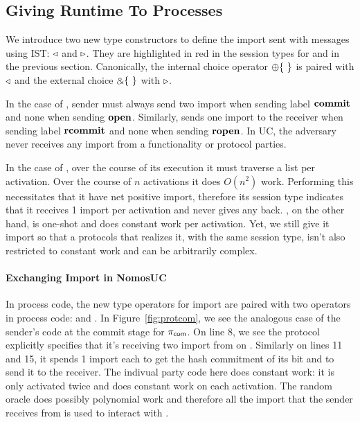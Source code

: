 \subsection{Giving Runtime To Processes}
We introduce two new type constructors to define the import sent with messages using IST: $\triangleleft$ and $\triangleright$.
They are highlighted in red in the session types for \Fcom and \Fro in the previous section.
Canonically, the internal choice operator $\ichoice$ is paired with $\triangleleft$ and the external choice $\echoice$ with $\triangleright$.

In the case of \Fcom, sender must always send two import when sending label $\mathbf{commit}$ and none when sending $\mathbf{open}$.
Similarly, \Fcom sends one import to the receiver when sending label $\mathbf{rcommit}$ and none when sending $\mathbf{ropen}$.
In UC, the adversary never receives any import from a functionality or protocol parties.

In the case of \Fro, over the course of its execution it must traverse a list per activation.
Over the course of $n$ activations it does $O(n^2)$ work.
Performing this necessitates that it have net positive import, therefore its session type indicates that it receives 1 import per activation and never gives any back.
\Fcom, on the other hand, is one-shot and does constant work per activation. Yet, we still give it import so that a protocols that realizes it, with the same session type, isn't also restricted to constant work and can be arbitrarily complex.

%

\paragraph{Exchanging Import in NomosUC}
In process code, the new type operators for import are paired with two operators in process code: \ipay and \iget.
In Figure~\ref{fig:protcom}, we see the analogous case of the sender's code at the commit stage for $\pi_{\mathsf{com}}$. 
On line 8, we see the protocol explicitly specifies that it's receiving two import from \Z on .
Similarly on lines 11 and 15, it spends 1 import each to get the hash commitment of its bit and to send it to the receiver.
The indivual party code here does constant work: it is only activated twice and does constant work on each activation.
The random oracle does possibly polynomial work and therefore all the import that the sender receives from \Z is used to interact with \Fro.

